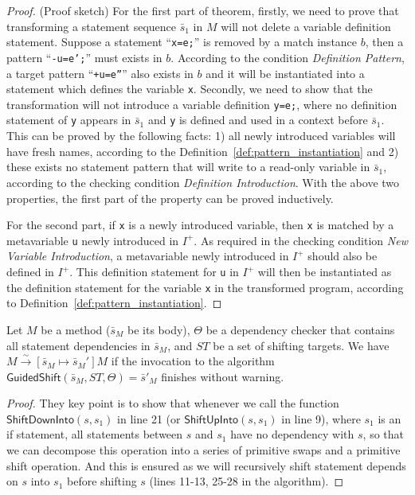 \documentclass[a4paper, USenglish]{lipics-v2016}
\newcommand{\code}[1]{\texttt{\footnotesize #1}}
\theoremstyle{plain}
\begin{document}
\begin{proof} (Proof sketch) For the first part of theorem, firstly, we need to prove that transforming a statement sequence $\bar{s}_1$ in $M$ will not delete a variable definition statement. Suppose a statement ``\code{x=e;}'' is removed by a match instance $b$, then a pattern ``\code{-u=e';}'' must exists in $b$. According to the condition \textit{Definition Pattern}, a target pattern ``\code{+u=e''}'' also exists in $b$ and it will be instantiated into a statement which defines the variable \code{x}. Secondly, we need to show that the transformation will not introduce a variable definition \code{y=e;}, where no definition statement of \code{y} appears in $\bar{s}_1$ and \code{y} is defined and used in a context before $\bar{s}_1$. This can be proved by the following facts: 1) all newly introduced variables will have fresh names, according to the Definition~\ref{def:pattern_instantiation} and 2) these exists no statement pattern that will write to a read-only variable in $\bar{s}_1$, according to the checking condition \textit{Definition Introduction}. With the above two properties, the first part of the property can be proved inductively.

For the second part, if \code{x} is a newly introduced variable, then \code{x} is matched by a metavariable \code{u} newly introduced in $I^+$. As required in the checking condition \textit{New Variable Introduction}, a metavariable newly introduced in $I^+$ should also be defined in $I^+$. This definition statement for \code{u} in $I^+$ will then be instantiated as the definition statement for the variable \code{x} in the transformed program, according to Definition~\ref{def:pattern_instantiation}.
\end{proof}

\begin{prop}
Let $M$ be a method ($\bar{s}_M$ be its body), $\Theta$ be a dependency
checker that contains all statement dependencies in $\bar{s}_M$, and
$\mathit{ST}$ be a set of shifting targets. We have
$M\xrightarrow{\sim}[\bar{s}_M\mapsto\bar{s}_M']M$ if the invocation
to the algorithm
$\mathsf{GuidedShift}(\bar{s}_M,\mathit{ST},\Theta)=\bar{s}'_M$
finishes without warning.  
\end{prop}
\begin{proof}They key point is to show that whenever we call the function $\mathsf{ShiftDownInto}(s, s_1)$ in line 21 (or $\mathsf{ShiftUpInto}(s, s_1)$ in line 9), where $s_1$ is an if statement, all statements between $s$ and $s_1$ have no dependency with $s$, so that we can decompose this operation into a series of primitive swaps and a primitive shift operation. And this is ensured as we will recursively shift statement depends on $s$ into $s_1$ before shifting $s$ (lines 11-13, 25-28 in the algorithm).
\end{proof}
\end{document}
